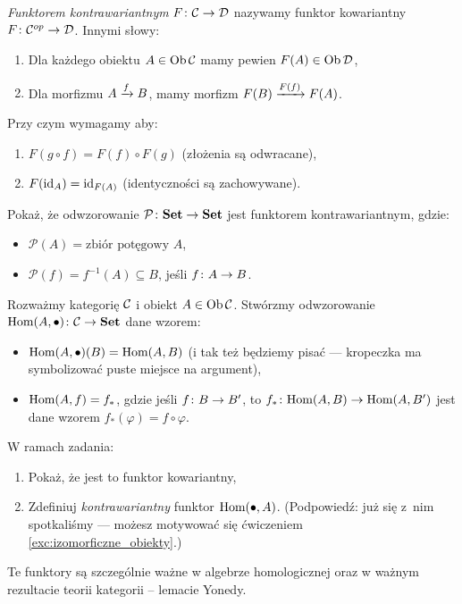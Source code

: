 \begin{defn}
  \emph{Funktorem kontrawariantnym} $\morph F\C\D$ nazywamy funktor kowariantny $\morph F {\op \C}{\D}$. Innymi słowy:
  \begin{enumerate}
    \item Dla każdego obiektu $A\in \Ob\C$ mamy pewien $F(A)\in \Ob\D$,
    \item Dla morfizmu $\morpharr fAB$, mamy morfizm $\morpharr {F(f)}{F(B)}{F(A)}$.
  \end{enumerate}
 Przy czym wymagamy aby:
  \begin{enumerate}
    \item $F(g\circ f) = F(f)\circ F(g)$ (złożenia są odwracane),
    \item $F(\id A) = \id{F(A)}$ (identyczności są zachowywane).
  \end{enumerate}
\end{defn}

\begin{exc}
  Pokaż, że odwzorowanie $\morph{\mathcal P}\Set\Set$ jest funktorem kontrawariantnym, gdzie:
  \begin{itemize}
    \item $\mathcal P(A) = \text{zbiór potęgowy $A$}$,
    \item $\mathcal P(f) = f^{-1}(A) \subseteq B$, jeśli $\morph fAB$.
  \end{itemize}
\end{exc}

\begin{exc}
  Rozważmy kategorię $\C$ i obiekt $A\in \Ob \C$. Stwórzmy odwzorowanie $\morph {\Mor A \bullet} \C \Set$ dane wzorem:
  \begin{itemize}
    \item $\Mor A \bullet(B) = \Mor AB$ (i tak też będziemy pisać --- kropeczka ma symbolizować puste miejsce na argument),
    \item $\Mor A f = f_*$, gdzie jeśli $\morph fB{B'}$, to $\morph{f_*}{\Mor AB}{\Mor A{B'}}$ jest dane wzorem $f_*(\varphi) = f\circ \varphi$.
  \end{itemize}
  W ramach zadania:
  \begin{enumerate}
    \item Pokaż, że jest to funktor kowariantny,
    \item Zdefiniuj \emph{kontrawariantny} funktor $\Mor \bullet A$. (Podpowiedź: już się z~nim spotkaliśmy --- możesz motywować się ćwiczeniem \ref{exc:izomorficzne_obiekty}.)
  \end{enumerate}
  Te funktory są szczególnie ważne w algebrze homologicznej oraz w ważnym rezultacie teorii kategorii -- lemacie Yonedy.
\end{exc}


